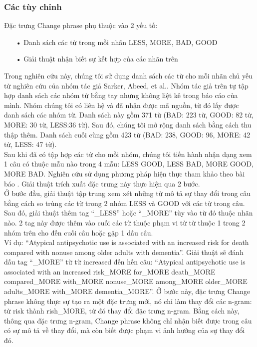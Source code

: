 \subsubsection*{Các tùy chỉnh}
Đặc trưng Change phrase phụ thuộc vào 2 yếu tố:
\begin{itemize}[noitemsep]
\item[•] Danh sách các từ trong mỗi nhãn LESS, MORE, BAD, GOOD
\item[•] Giải thuật nhận biết sự kết hợp của các nhãn trên
\end{itemize}
Trong nghiên cứu này, chúng tôi sử dụng danh sách các từ cho mỗi nhãn chủ yếu từ nghiên cứu của nhóm tác giả Sarker, Abeed, et al.\cite{sarker2011outcome}. Nhóm tác giả trên tự tập hợp danh sách các nhóm từ bằng tay nhưng không liệt kê trong báo cáo của mình. Nhóm chúng tôi có liên hệ và đã nhận được mã nguồn, từ đó lấy được danh sách các nhóm từ. Danh sách này gồm 371 từ (BAD: 223 từ, GOOD: 82 từ, MORE: 30 từ, LESS:36 từ). Sau đó, chúng tôi mở rộng danh sách bằng cách thu thập thêm. Danh sách cuối cùng gồm 423 từ (BAD: 238, GOOD: 96, MORE: 42 từ, LESS: 47 từ).\\

Sau khi đã có tập hợp các từ cho mỗi nhóm, chúng tôi tiến hành nhận dạng xem 1 câu có thuộc mẫu nào trong 4 mẫu: LESS GOOD, LESS BAD, MORE GOOD, MORE BAD. Nghiên cứu sử dụng phương pháp hiện thực tham khảo theo bài báo \cite{niu2005analysis}. Giải thuật trích xuất đặc trưng này thực hiện qua 2 bước.\\

Ở bước đầu, giải thuật tập trung xem xét những từ mô tả sự thay đổi trong câu bằng cách so trùng các từ trong 2 nhóm LESS và GOOD với các từ trong câu. Sau đó, giải thuật thêm tag ``\_LESS'' hoặc ``\_MORE'' tùy vào từ đó thuộc nhãn nào. 2 tag này được thêm vào cuối các từ thuộc phạm vi từ từ thuộc 1 trong 2 nhóm trên cho đến cuối câu hoặc gặp 1 dấu câu. \\

Ví dụ: “Atypical antipsychotic use is associated with an increased risk for death compared with nonuse among older adults with dementia”. Giải thuật sẽ đánh dấu tag ``\_MORE'' từ từ increased đến hến câu: ``Atypical antipsychotic use is associated with an increased risk\_MORE for\_MORE death\_MORE compared\_MORE with\_MORE nonuse\_MORE among\_MORE older\_MORE adults\_MORE with\_MORE dementia\_MORE''. Ở bước này, đặc trưng Change phrase không thực sự tạo ra một đặc trưng mới, nó chỉ làm thay đổi các n-gram: từ risk thành rish\_MORE, từ đó thay đổi đặc trưng n-gram. Bằng cách này, thông qua đặc trưng n-gram, Change phrase không chỉ nhận biết được trong câu có sự mô tả về thay đổi, mà còn biết được phạm vi ảnh hưởng của sự thay đổi đó.\\

